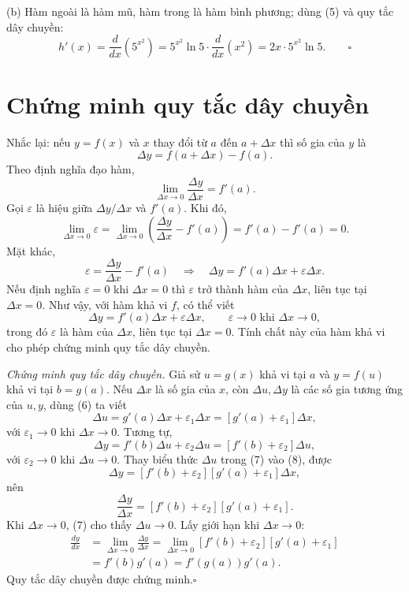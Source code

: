 \documentclass[12pt,a4paper]{article}
\begin{document}
(b) Hàm ngoài là hàm mũ, hàm trong là hàm bình phương; dùng (5) và quy tắc dây chuyền:
\[h'(x)=\frac{d}{dx}(5^{x^2})=5^{x^2}\ln5\cdot\frac{d}{dx}(x^2)=2x\cdot5^{x^2}\ln5.\qquad\square\]
\section*{Chứng minh quy tắc dây chuyền}
Nhắc lại: nếu $y=f(x)$ và $x$ thay đổi từ $a$ đến $a+\Delta x$ thì số gia của $y$ là
\[\Delta y=f(a+\Delta x)-f(a).\]
Theo định nghĩa đạo hàm,
\[\lim_{\Delta x\to0}\frac{\Delta y}{\Delta x}=f'(a).\]
Gọi $\varepsilon$ là hiệu giữa $\Delta y/\Delta x$ và $f'(a)$. Khi đó,
\[\lim_{\Delta x\to0}\varepsilon=\lim_{\Delta x\to0}\left(\frac{\Delta y}{\Delta x}-f'(a)\right)=f'(a)-f'(a)=0.\]
Mặt khác,
\[\varepsilon=\frac{\Delta y}{\Delta x}-f'(a)\quad\Longrightarrow\quad \Delta y=f'(a)\Delta x+\varepsilon\Delta x.\]
Nếu định nghĩa $\varepsilon=0$ khi $\Delta x=0$ thì $\varepsilon$ trở thành hàm của $\Delta x$, liên tục tại $\Delta x=0$. Như vậy, với hàm khả vi $f$, có thể viết
\[\Delta y=f'(a)\Delta x+\varepsilon\Delta x,\qquad \varepsilon\to0\text{ khi }\Delta x\to0,\tag{6}\]
trong đó $\varepsilon$ là hàm của $\Delta x$, liên tục tại $\Delta x=0$. Tính chất này của hàm khả vi cho phép chứng minh quy tắc dây chuyền.

\noindent\textit{Chứng minh quy tắc dây chuyền.} Giả sử $u=g(x)$ khả vi tại $a$ và $y=f(u)$ khả vi tại $b=g(a)$. Nếu $\Delta x$ là số gia của $x$, còn $\Delta u,\Delta y$ là các số gia tương ứng của $u,y$, dùng (6) ta viết
\[\Delta u=g'(a)\Delta x+\varepsilon_1\Delta x=[g'(a)+\varepsilon_1]\Delta x,\tag{7}\]
với $\varepsilon_1\to0$ khi $\Delta x\to0$. Tương tự,
\[\Delta y=f'(b)\Delta u+\varepsilon_2\Delta u=[f'(b)+\varepsilon_2]\Delta u,\tag{8}\]
với $\varepsilon_2\to0$ khi $\Delta u\to0$. Thay biểu thức $\Delta u$ trong (7) vào (8), được
\[\Delta y=[f'(b)+\varepsilon_2][g'(a)+\varepsilon_1]\Delta x,\]
nên
\[\frac{\Delta y}{\Delta x}=[f'(b)+\varepsilon_2][g'(a)+\varepsilon_1].\]
Khi $\Delta x\to0$, (7) cho thấy $\Delta u\to0$. Lấy giới hạn khi $\Delta x\to0$:
\begin{align*}
\frac{dy}{dx}&=\lim_{\Delta x\to0}\frac{\Delta y}{\Delta x}
=\lim_{\Delta x\to0}[f'(b)+\varepsilon_2][g'(a)+\varepsilon_1]\\
&=f'(b)g'(a)=f'(g(a))g'(a).
\end{align*}
Quy tắc dây chuyền được chứng minh.\hfill$\square$
\end{document}
